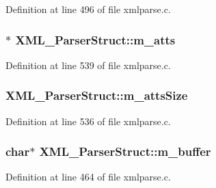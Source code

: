 Definition at line 496 of file xmlparse.\+c.

\subsubsection[{\texorpdfstring{m\+\_\+atts}{m_atts}}]{$\ast$ X\+M\+L\+\_\+\+Parser\+Struct\+::m\+\_\+atts}\hypertarget{struct_x_m_l___parser_struct_acc913a0ed49bd3a5e697064ae5682ea7}{}\label{struct_x_m_l___parser_struct_acc913a0ed49bd3a5e697064ae5682ea7}


Definition at line 539 of file xmlparse.\+c.

\subsubsection[{\texorpdfstring{m\+\_\+atts\+Size}{m_attsSize}}]{ X\+M\+L\+\_\+\+Parser\+Struct\+::m\+\_\+atts\+Size}\hypertarget{struct_x_m_l___parser_struct_ad0e6771e02a5aa8372c7a032d7e263ff}{}\label{struct_x_m_l___parser_struct_ad0e6771e02a5aa8372c7a032d7e263ff}


Definition at line 536 of file xmlparse.\+c.

\subsubsection[{\texorpdfstring{m\+\_\+buffer}{m_buffer}}]{\setlength{\rightskip}{0pt plus 5cm}char$\ast$ X\+M\+L\+\_\+\+Parser\+Struct\+::m\+\_\+buffer}\hypertarget{struct_x_m_l___parser_struct_a5217c5dc81da5b986c2043a32353ab1a}{}\label{struct_x_m_l___parser_struct_a5217c5dc81da5b986c2043a32353ab1a}


Definition at line 464 of file xmlparse.\+c.

